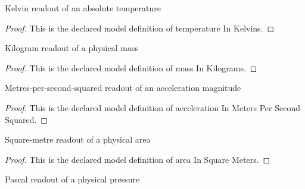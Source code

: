 \begin{definition}
  \label{def:physics:phyx-mini-0436:phyxminiproblems-problemphyxmini0436-temperatureinkelvins}
  Kelvin readout of an absolute temperature
\end{definition}
\begin{proof}
  This is the declared model definition of temperature In Kelvins.
\end{proof}
\begin{definition}
  \label{def:physics:phyx-mini-0436:phyxminiproblems-problemphyxmini0436-massinkilograms}
  Kilogram readout of a physical mass
\end{definition}
\begin{proof}
  This is the declared model definition of mass In Kilograms.
\end{proof}
\begin{definition}
  \label{def:physics:phyx-mini-0436:phyxminiproblems-problemphyxmini0436-accelerationinmeterspersecondsquared}
  Metres-per-second-squared readout of an acceleration magnitude
\end{definition}
\begin{proof}
  This is the declared model definition of acceleration In Meters Per Second Squared.
\end{proof}
\begin{definition}
  \label{def:physics:phyx-mini-0436:phyxminiproblems-problemphyxmini0436-areainsquaremeters}
  Square-metre readout of a physical area
\end{definition}
\begin{proof}
  This is the declared model definition of area In Square Meters.
\end{proof}
\begin{definition}
  \label{def:physics:phyx-mini-0436:phyxminiproblems-problemphyxmini0436-pressureinpascals}
  Pascal readout of a physical pressure
\end{definition}
